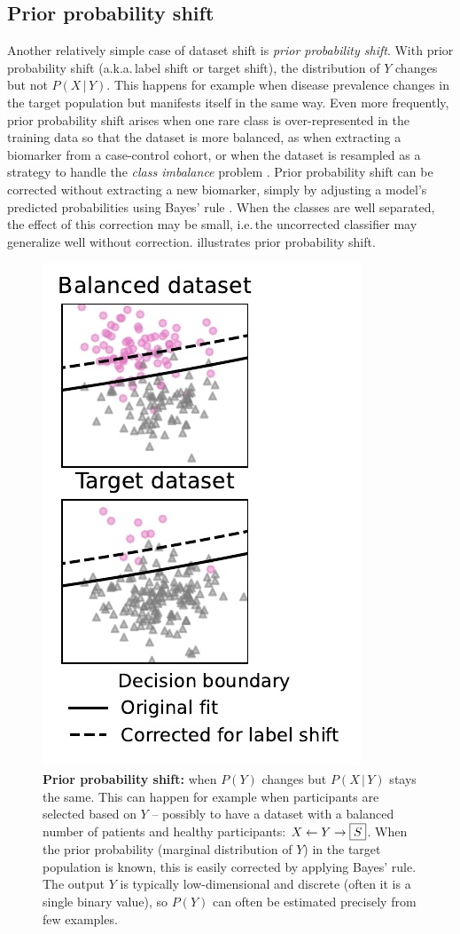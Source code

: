 \documentclass[a4paper,num-refs]{oup-contemporary}
\newcommand{\giv}{ \,|\, }
\newcommand{\ie}{i.e.\,}
\newcommand{\aka}{a.k.a.\,}
\begin{document}
\subsection{Prior probability shift}
\label{sec:prior-probability-shift}

Another relatively simple case of dataset shift is \emph{prior probability shift}.
With prior probability shift (\aka label shift or target shift), the
distribution of \(Y\) changes but not \(P(X \giv Y)\).
This happens for example when disease prevalence changes in the target population but manifests itself in the same way.
Even more frequently, prior probability shift arises when one rare class is over-represented in the training data so that the dataset is more balanced, as when extracting a biomarker from a case-control cohort, or when the dataset is resampled as a strategy to handle the \emph{class imbalance} problem \citep{he2009learning}.
Prior probability shift can be corrected without extracting a new biomarker, simply by adjusting a model's predicted probabilities using Bayes' rule \citep[as noted for example in][]{storkey2009training,scholkopf2012causal}.
When the classes are well separated, the effect of this correction may be small, \ie the uncorrected classifier may generalize well without correction.
 illustrates prior probability shift.
%
\begin{figure}
  \centering
  \includegraphics[width=.5\linewidth]{figures/simulations/label_shift_naive_bayes/label_shift.pdf}
  \caption{
    \textbf{Prior probability shift:} when \(P(Y)\) changes but \(P(X
    \giv Y)\) stays the same. This can happen for example when participants are
    selected based on \(Y\) -- possibly to have a dataset with a balanced number
    of patients and healthy participants: \(X \leftarrow Y \rightarrow \text{\fbox{$S$}}\).
    When the prior probability (marginal distribution of \(Y\)) in the
    target population is known, this is easily corrected by applying Bayes' rule.
    The output \(Y\) is typically low-dimensional and discrete
    (often it is a single binary value), so \(P(Y)\) can often be estimated
    precisely from few examples.}
  \label{fig:label-shift-scatter}
\end{figure}
\end{document}
